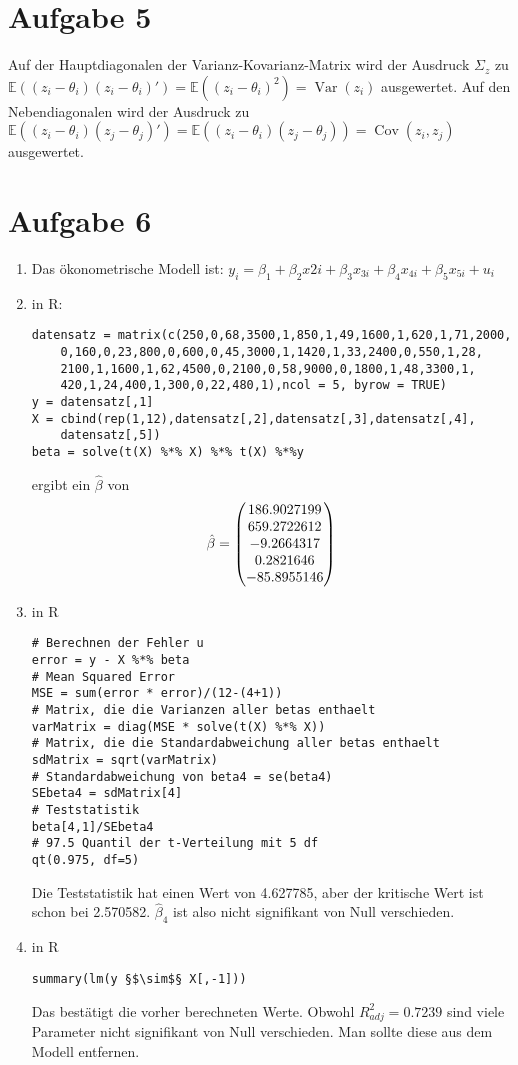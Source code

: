 \documentclass{article}
\newcommand{\E}{\mathbb{E}}
\DeclareMathOperator{\Var}{Var}
\DeclareMathOperator{\Cov}{Cov}
\begin{document}
	\section*{Aufgabe 5}
	Auf der Hauptdiagonalen der Varianz-Kovarianz-Matrix wird der Ausdruck $\Sigma_z$ zu $\E((z_i-\theta_i)(z_i-\theta_i)') = \E((z_i-\theta_i)^2) = \Var(z_i)$ ausgewertet. Auf den Nebendiagonalen wird der Ausdruck zu $\E((z_i-\theta_i)(z_j-\theta_j)') = \E((z_i-\theta_i)(z_j-\theta_j)) = \Cov(z_i,z_j)$ ausgewertet.
	
	\section*{Aufgabe 6}
	\begin{enumerate}[label=(\alph*)]
		\item Das ökonometrische Modell ist: $y_i = \beta_1 + \beta_2x{2i} + \beta_3x_{3i} + \beta_4x_{4i} + \beta_5x_{5i} + u_i$
		\item in R:
		\begin{lstlisting}[style=R]
datensatz = matrix(c(250,0,68,3500,1,850,1,49,1600,1,620,1,71,2000,
	0,160,0,23,800,0,600,0,45,3000,1,1420,1,33,2400,0,550,1,28,
	2100,1,1600,1,62,4500,0,2100,0,58,9000,0,1800,1,48,3300,1,
	420,1,24,400,1,300,0,22,480,1),ncol = 5, byrow = TRUE)
y = datensatz[,1]
X = cbind(rep(1,12),datensatz[,2],datensatz[,3],datensatz[,4],
	datensatz[,5])
beta = solve(t(X) %*% X) %*% t(X) %*%y
		\end{lstlisting}
		ergibt ein $\hat{\beta}$ von
		\begin{align}
			\hat{\beta} = \begin{pmatrix}
				186.9027199 \\
				659.2722612 \\
				-9.2664317 \\
				0.2821646 \\
				-85.8955146
			\end{pmatrix} \notag
		\end{align}
		\item in R
		\begin{lstlisting}[style=R]
# Berechnen der Fehler u
error = y - X %*% beta
# Mean Squared Error
MSE = sum(error * error)/(12-(4+1))
# Matrix, die die Varianzen aller betas enthaelt
varMatrix = diag(MSE * solve(t(X) %*% X))
# Matrix, die die Standardabweichung aller betas enthaelt
sdMatrix = sqrt(varMatrix)
# Standardabweichung von beta4 = se(beta4)
SEbeta4 = sdMatrix[4]
# Teststatistik
beta[4,1]/SEbeta4
# 97.5 Quantil der t-Verteilung mit 5 df
qt(0.975, df=5)
		\end{lstlisting}
		Die Teststatistik hat einen Wert von 4.627785, aber der kritische Wert ist schon bei 2.570582. $\hat{\beta}_4$ ist also nicht signifikant von Null verschieden.
		\item in R
		\begin{lstlisting}[style=R]
summary(lm(y §$\sim$§ X[,-1]))
		\end{lstlisting}
		Das bestätigt die vorher berechneten Werte. Obwohl $R^2_{adj} = 0.7239$ sind viele Parameter nicht signifikant von Null verschieden. Man sollte diese aus dem Modell entfernen.
	\end{enumerate}
\end{document}
